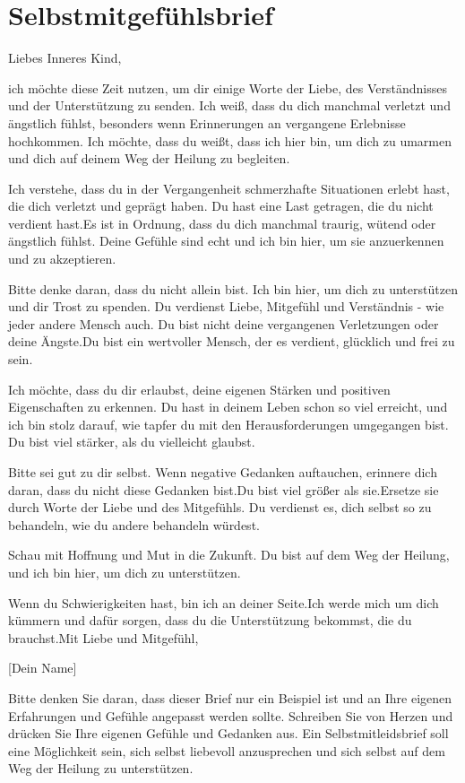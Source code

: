 \section{Selbstmitgefühlsbrief}
Liebes Inneres Kind,

ich möchte diese Zeit nutzen, um dir einige Worte der Liebe, des Verständnisses und der Unterstützung zu senden. Ich weiß, dass du dich manchmal verletzt und ängstlich fühlst, besonders wenn Erinnerungen an vergangene Erlebnisse hochkommen. Ich möchte, dass du weißt, dass ich hier bin, um dich zu umarmen und dich auf deinem Weg der Heilung zu begleiten.

Ich verstehe, dass du in der Vergangenheit schmerzhafte Situationen erlebt hast, die dich verletzt und geprägt haben.  Du hast eine Last getragen, die du nicht verdient hast.Es ist in Ordnung, dass du dich manchmal traurig, wütend oder ängstlich fühlst. Deine Gefühle sind echt und ich bin hier, um sie anzuerkennen und zu akzeptieren.

Bitte denke daran, dass du nicht allein bist. Ich bin hier, um dich zu unterstützen und dir Trost zu spenden. Du verdienst Liebe, Mitgefühl und Verständnis - wie jeder andere Mensch auch.  Du bist nicht deine vergangenen Verletzungen oder deine Ängste.Du bist ein wertvoller Mensch, der es verdient, glücklich und frei zu sein.

Ich möchte, dass du dir erlaubst, deine eigenen Stärken und positiven Eigenschaften zu erkennen. Du hast in deinem Leben schon so viel erreicht, und ich bin stolz darauf, wie tapfer du mit den Herausforderungen umgegangen bist. Du bist viel stärker, als du vielleicht glaubst.

Bitte sei gut zu dir selbst.   Wenn negative Gedanken auftauchen, erinnere dich daran, dass du nicht diese Gedanken bist.Du bist viel größer als sie.Ersetze sie durch Worte der Liebe und des Mitgefühls. Du verdienst es, dich selbst so zu behandeln, wie du andere behandeln würdest.

Schau mit Hoffnung und Mut in die Zukunft. Du bist auf dem Weg der Heilung, und ich bin hier, um dich zu unterstützen.  



Wenn du Schwierigkeiten hast, bin ich an deiner Seite.Ich werde mich um dich kümmern und dafür sorgen, dass du die Unterstützung bekommst, die du brauchst.Mit Liebe und Mitgefühl,

[Dein Name]

Bitte denken Sie daran, dass dieser Brief nur ein Beispiel ist und an Ihre eigenen Erfahrungen und Gefühle angepasst werden sollte. Schreiben Sie von Herzen und drücken Sie Ihre eigenen Gefühle und Gedanken aus. Ein Selbstmitleidsbrief soll eine Möglichkeit sein, sich selbst liebevoll anzusprechen und sich selbst auf dem Weg der Heilung zu unterstützen.


